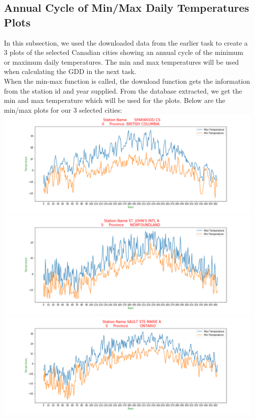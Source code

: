 \subsection{Annual Cycle of Min/Max Daily Temperatures Plots }
In this subsection, we used the downloaded data from the earlier task to create a 3 plots of the selected Canadian cities showing an annual cycle of the minimum or maximum daily temperatures. The min and max temperatures will be used when calculating the GDD in the next task. \\
When the min-max function is called, the download function gets the information from the station id and year supplied. From the database extracted, we get the min and max temperature  which will be used for the plots. 
Below are the min/max plots for our 3 selected cities:\\


\includegraphics[scale=0.35]{Fig_6842_2015.png}\\

\includegraphics[scale=0.35]{Fig_50089_2015.png}\\

\includegraphics[scale=0.35]{Fig_50092_2015.png}\\

